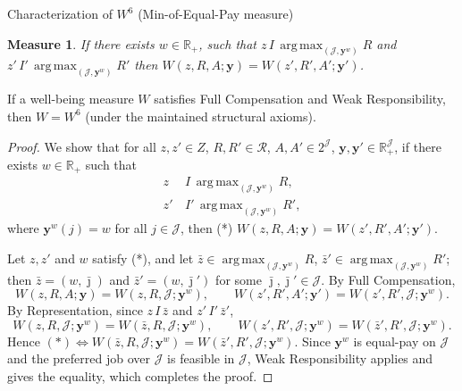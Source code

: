 \documentclass[10pt]{beamer}
\DeclareMathOperator*{\argmax}{arg\,max}
\newtheorem{Measure}{Measure}
\begin{document}
\begin{frame}[allowframebreaks]{Characterization of $W^6$ (Min-of-Equal-Pay measure)}
\hypertarget{char:w6}{}%
\hyperlink{tab:classification}{}
\begin{Measure}
     If there exists $w\in\mathbb{R}_{+}$, such that $z\,I\,\argmax_{(\mathcal{J},\mathbf{y}^w)}R$ and $z'\,I'\,\argmax_{(\mathcal{J},\mathbf{y}^w)}R'$ then $W(z,R,A;\mathbf{y})=W(z',R',A';\mathbf{y}')$.

\end{Measure}
\scriptsize
\begin{theorem}
If a well-being measure $W$ satisfies Full Compensation and Weak
Responsibility, then $W=W^6$ (under the maintained structural axioms).
\end{theorem}

\begin{proof}
We show that for all $z,z'\in Z$, $R,R'\in\mathcal R$, $A,A'\in 2^{\mathcal J}$,
$\mathbf y,\mathbf y'\in\mathbb R_+^{\mathcal J}$, if there exists
$w\in\mathbb R_+$ such that
\begin{align*}
z\,&I\,\argmax_{(\mathcal J,\mathbf y^w)}R,\\
z'\,&I'\,\argmax_{(\mathcal J,\mathbf y^w)}R',\end{align*}
where $\mathbf y^w(j)=w$ for all $j\in\mathcal J$, then (*)
$W(z,R,A;\mathbf y)=W(z',R',A';\mathbf y')$.

Let $z,z'$ and $w$ satisfy (*), and let
$\bar z\in\argmax_{(\mathcal J,\mathbf y^w)}R$,
$\bar z'\in\argmax_{(\mathcal J,\mathbf y^w)}R'$; then $\bar z=(w,\bar\jmath)$ and
$\bar z'=(w,\bar\jmath')$ for some $\bar\jmath,\bar\jmath'\in\mathcal J$. By Full
Compensation,
\begin{equation*}
W(z,R,A;\mathbf y)=W(z,R,\mathcal J;\mathbf y^w),\qquad
W(z',R',A';\mathbf y')=W(z',R',\mathcal J;\mathbf y^w).
\end{equation*}
By Representation, since $z\,I\,\bar z$ and $z'\,I'\,\bar z'$,
\begin{equation*}
W(z,R,\mathcal J;\mathbf y^w)=W(\bar z,R,\mathcal J;\mathbf y^w),\qquad
W(z',R',\mathcal J;\mathbf y^w)=W(\bar z',R',\mathcal J;\mathbf y^w).
\end{equation*}
Hence $(*)\Leftrightarrow W(\bar z,R,\mathcal J;\mathbf y^w)=W(\bar
z',R',\mathcal J;\mathbf y^w)$. Since $\mathbf y^w$ is equal-pay on
$\mathcal J$ and the preferred job over $\mathcal J$ is feasible in
$\mathcal J$, Weak Responsibility applies and gives the equality, which
completes the proof.
\end{proof}

\medskip
\hyperlink{tab:classification}{}
\end{frame}
\end{document}
